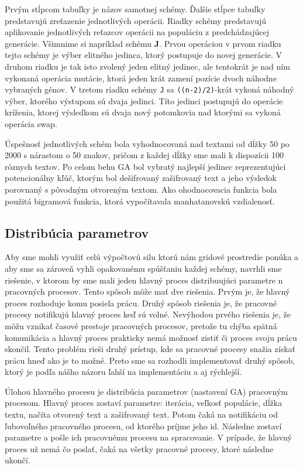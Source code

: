 Prvým stĺpcom tabuľky je názov samotnej schémy. Ďalšie stĺpce tabuľky predstavujú zreťazenie jednotlivých operácii. Riadky schémy predstavujú aplikovanie jednotlivých reťazcov operácii na populáciu z predchádzajúcej generácie.
Všimnime si napríklad schému \textbf{J}.
Prvou operáciou v prvom riadku tejto schémy je výber elitného jedinca, ktorý postupuje do novej generácie.
V druhom riadku je tak isto zvolený jeden elitný jedinec, ale tentokrát je nad ním vykonaná operácia mutácie, ktorá jeden krát zamení pozície dvoch náhodne vybraných génov.
V tretom riadku schémy \texttt{J} sa \texttt{((n-2)/2)}-krát vykoná náhodný výber, ktorého výstupom sú dvaja jedinci. Títo jedinci postupujú do operácie kríženia,
ktorej výsledkom sú dvaja nový potomkovia nad ktorými sa vykoná operácia swap.

Úspešnosť jednotlivých schém bola vyhodnocovaná nad textami od dĺžky 50 po 2000 s nárastom o 50 znakov,
pričom z každej dĺžky sme mali k dispozícii 100 rôznych textov.
Po celom behu GA bol vybratý najlepší jedinec reprezentujúci potencionálny kľúč,
ktorým bol dešifrovaný zašifrovaný text a jeho výsledok porovnaný s pôvodným otvoreným textom.
Ako ohodnocovacia funkcia bola použitá bigramová funkcia, ktorá vypočítavala manhatanovskú vzdialenosť.
\subsection{Distribúcia parametrov}
Aby sme mohli využiť celú výpočtovú silu ktorú nám gridové prostredie ponúka a aby sme sa zároveň vyhli opakovanému spúšťaniu každej schémy,
navrhli sme riešenie, v ktorom by sme mali jeden hlavný proces distribuujúci parametre n pracovných procesov.
Tento spôsob môže mať dve riešenia. Prvým je, že hlavný proces rozhoduje komu posiela prácu. Druhý spôsob riešenia je, že pracovné procesy
notifikujú hlavný proces keď sú volné. Nevýhodou prvého riešenia je, že môžu vznikať časové prestoje pracovných procesov,
pretože tu chýba spätná komunikácia a hlavný proces prakticky nemá možnosť zistiť či proces svoju prácu skončil.
Tento problém rieši druhý prístup, kde sa pracovné procesy snažia získať prácu hneď ako je to možné.
Preto sme sa rozhodli implementovať druhý spôsob, ktorý je podľa nášho názoru ľahší na implementáciu a aj rýchlejší.

Úlohou hlavného procesu je distribúcia parametrov (nastavení GA) pracovným procesom. Hlavný proces zostaví parametre: iterácia, veľkosť populácie, dĺžka textu,
načíta otvorený text a zašifrovaný text. Potom čaká na notifikáciu od ľubovoľného pracovného procesu, od ktorého príjme jeho id.
Následne zostaví parametre a pošle ich pracovnému procesu na spracovanie.
V prípade, že hlavný proces už nemá čo poslať, čaká na všetky pracovné procesy, ktoré následne ukončí.

